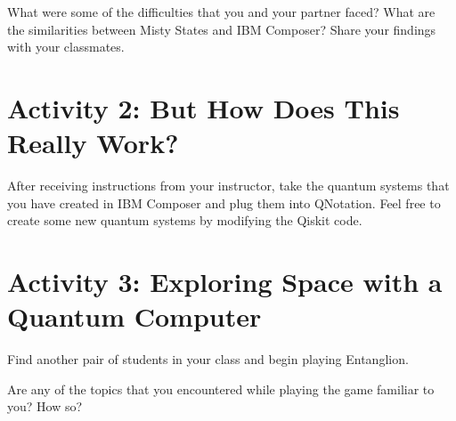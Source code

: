 \documentclass{article}
\begin{document}
What were some of the difficulties that you and your partner faced? What are the similarities between Misty States and IBM Composer? Share your findings with your classmates. 
\section{Activity 2: But How Does This Really Work?}

After receiving instructions from your instructor, take the quantum systems that you have created in IBM Composer and plug them into QNotation. Feel free to create some new quantum systems by modifying the Qiskit code.

\section{Activity 3: Exploring Space with a Quantum Computer}

Find another pair of students in your class and begin playing Entanglion.

Are any of the topics that you encountered while playing the game familiar to you? How so?
\end{document}
